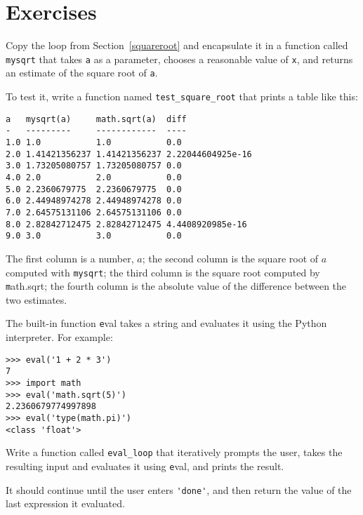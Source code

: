 \documentclass[
DIV=11,
fontsize=12,
twoside,
headinclude=false,
titlepage=firstiscover,
abstract=true,
headsepline=true,
footsepline=true,
chapterprefix=true, %
headings=big,
bibliography=totoc,%
captions=tableheading
]{scrbook}
\theoremstyle{definition}
\begin{document}
\section{Exercises}

\begin{exercise}
\normalfont
{}

Copy the loop from Section~\ref{squareroot}
and encapsulate it in a function called
\verb"mysqrt" that takes {\texttt a} as a parameter, chooses a
reasonable value of {\texttt x}, and returns an estimate of the square
root of {\texttt a}.  

To test it, write a function named \verb"test_square_root"
that prints a table like this:

\begin{lstlisting}
a   mysqrt(a)     math.sqrt(a)  diff
-   ---------     ------------  ----
1.0 1.0           1.0           0.0
2.0 1.41421356237 1.41421356237 2.22044604925e-16
3.0 1.73205080757 1.73205080757 0.0
4.0 2.0           2.0           0.0
5.0 2.2360679775  2.2360679775  0.0
6.0 2.44948974278 2.44948974278 0.0
7.0 2.64575131106 2.64575131106 0.0
8.0 2.82842712475 2.82842712475 4.4408920985e-16
9.0 3.0           3.0           0.0
\end{lstlisting}
%
The first column is a number, $a$; the second column is the square
root of $a$ computed with \verb"mysqrt"; the third column is the
square root computed by {\texttt math.sqrt}; the fourth column is the
absolute value of the difference between the two estimates.
\end{exercise}


\begin{exercise}
\normalfont
{}

The built-in function {\texttt eval} takes a string and evaluates
it using the Python interpreter.  For example:

\begin{lstlisting}
>>> eval('1 + 2 * 3')
7
>>> import math
>>> eval('math.sqrt(5)')
2.2360679774997898
>>> eval('type(math.pi)')
<class 'float'>
\end{lstlisting}
%
Write a function called \verb"eval_loop" that iteratively
prompts the user, takes the resulting input and evaluates
it using {\texttt eval}, and prints the result.

It should continue until the user enters \verb"'done'", and then
return the value of the last expression it evaluated.

\end{exercise}
\end{document}
